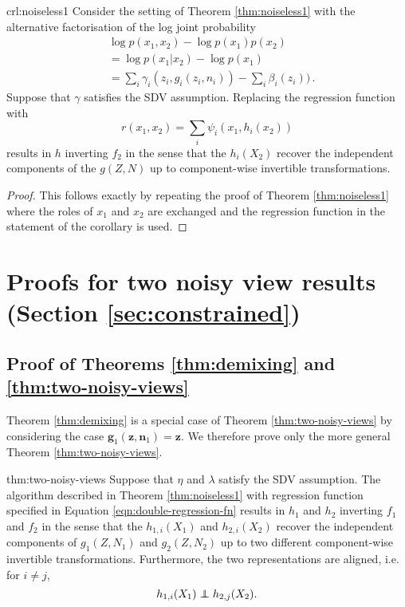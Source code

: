 \begin{repcorollary}{crl:noiseless1}
	Consider the setting of Theorem \ref{thm:noiseless1} with the alternative factorisation of the log joint probability
	\begin{align}
	&\log p({x}_1, {x}_2) - \log p({x}_1) p({x}_2) \nonumber \\
	&= \log p({x}_1 | {x}_2) - \log p({x}_1)\nonumber \\
	&= \sum_i \gamma_i(z_i, g_i(z_i, n_i)) - \sum_i \beta_i(z_i)) \label{eq:logdens_noiesless_2}\,.
	\end{align}
	Suppose that ${\gamma}$ satisfies the SDV assumption.
	Replacing the regression function with
	\begin{equation*}
	r({x}_{1},{x}_{2})=\sum_{i}\psi_{i}({x}_{1}, h_{i}({x}_{2}))
	\end{equation*}
	results in ${h}$ inverting ${f}_2$ in the sense that the $h_{i}({X}_2)$ recover the independent components of the ${g}({Z}, {N})$ up  to component-wise invertible transformations.
\end{repcorollary}

\begin{proof}
	This follows exactly by repeating the proof of Theorem \ref{thm:noiseless1} where the roles of $x_1$ and ${x}_2$ are exchanged and the regression function in the statement of the corollary is used.
\end{proof}


\section{Proofs for two noisy view results (Section \ref{sec:constrained})}

\subsection{Proof of Theorems \ref{thm:demixing} and \ref{thm:two-noisy-views}}
\label{appendix:thm1}

Theorem \ref{thm:demixing} is a special case of Theorem \ref{thm:two-noisy-views} by considering the case $\bm{g}_1(\bm{z}, \bm{n}_1) = \bm{z}$.
We therefore prove only the more general Theorem \ref{thm:two-noisy-views}.

\medskip

\begin{reptheorem}{thm:two-noisy-views}
	Suppose that ${\eta}$ and ${\lambda}$ satisfy the SDV assumption.
	The algorithm described in Theorem \ref{thm:noiseless1} with regression function specified in Equation \ref{eqn:double-regression-fn} results in ${h}_1$ and ${h}_2$ inverting ${f}_1$ and ${f}_2$ in the sense that the $h_{1,i}({X}_1)$ and $h_{2,i}({X}_2)$ recover the independent components of ${g}_1({Z}, {N}_1)$ and ${g}_2({Z}, {N}_2)$ up to two different component-wise invertible transformations. Furthermore, the two representations are aligned, i.e. for $i\not=j$,
	\begin{equation*}
	h_{1,i}({X}_{1})\independent h_{2,j}({X}_{2}).
	\end{equation*}
\end{reptheorem}



